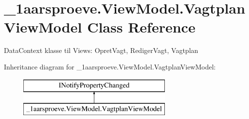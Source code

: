 \hypertarget{class__1aarsproeve_1_1_view_model_1_1_vagtplan_view_model}{}\section{\+\_\+1aarsproeve.\+View\+Model.\+Vagtplan\+View\+Model Class Reference}
\label{class__1aarsproeve_1_1_view_model_1_1_vagtplan_view_model}


Data\+Context klasse til Views\+: Opret\+Vagt, Rediger\+Vagt, Vagtplan  


Inheritance diagram for \+\_\+1aarsproeve.\+View\+Model.\+Vagtplan\+View\+Model\+:\begin{figure}[H]
\begin{center}
\leavevmode
\includegraphics[height=2.000000cm]{class__1aarsproeve_1_1_view_model_1_1_vagtplan_view_model}
\end{center}
\end{figure}
